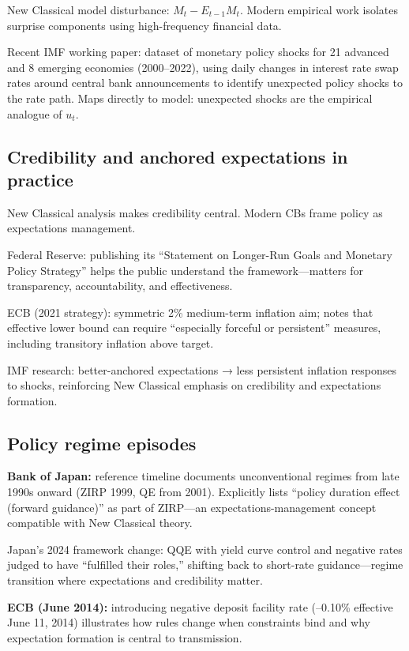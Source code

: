 \documentclass[
  letterpaper,
  DIV=11,
  numbers=noendperiod]{scrartcl}
\begin{document}
New Classical model disturbance: \(M_t - E_{t-1}M_t\). Modern empirical
work isolates surprise components using high-frequency financial data.

Recent IMF working paper: dataset of monetary policy shocks for 21
advanced and 8 emerging economies (2000--2022), using daily changes in
interest rate swap rates around central bank announcements to identify
unexpected policy shocks to the rate path. Maps directly to model:
unexpected shocks are the empirical analogue of \(u_t\).

\subsection{Credibility and anchored expectations in
practice}\label{credibility-and-anchored-expectations-in-practice}

New Classical analysis makes credibility central. Modern CBs frame
policy as expectations management.

Federal Reserve: publishing its ``Statement on Longer-Run Goals and
Monetary Policy Strategy'' helps the public understand the
framework---matters for transparency, accountability, and effectiveness.

ECB (2021 strategy): symmetric 2\% medium-term inflation aim; notes that
effective lower bound can require ``especially forceful or persistent''
measures, including transitory inflation above target.

IMF research: better-anchored expectations → less persistent inflation
responses to shocks, reinforcing New Classical emphasis on credibility
and expectations formation.

\subsection{Policy regime episodes}\label{policy-regime-episodes}

\textbf{Bank of Japan:} reference timeline documents unconventional
regimes from late 1990s onward (ZIRP 1999, QE from 2001). Explicitly
lists ``policy duration effect (forward guidance)'' as part of ZIRP---an
expectations-management concept compatible with New Classical theory.

Japan's 2024 framework change: QQE with yield curve control and negative
rates judged to have ``fulfilled their roles,'' shifting back to
short-rate guidance---regime transition where expectations and
credibility matter.

\textbf{ECB (June 2014):} introducing negative deposit facility rate
(--0.10\% effective June 11, 2014) illustrates how rules change when
constraints bind and why expectation formation is central to
transmission.
\end{document}
